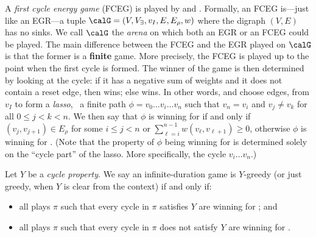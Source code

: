\documentclass[a4paper]{article}
\begin{document}
 A \emph{first cycle energy game} (FCEG)
is played by \eve and \adam. Formally, an FCEG is---just like an EGR---a tuple
$\calG = (V,V_\exists,v_I,E,E_\rho,w)$ where the digraph $(V,E)$ has no sinks.
We call $\calG$ the \emph{arena} on which both an EGR or an FCEG could be
played.  The main difference between the FCEG and the EGR played on $\calG$ is
that the former is a \textbf{finite} game. More precisely, the FCEG is played up
to the point when the first cycle is formed.  The winner of the game is then
determined by looking at the cycle: if it has a negative sum of weights and it
does not contain a reset edge, then \adam wins; else \eve wins. In other words,
\adam and \eve choose edges, from $v_I$ to form a \emph{lasso}, \ie~a finite
path $\phi = v_0 \dots v_i \dots v_n$ such that $v_n = v_i$ and $v_j \neq v_k$
for all $0 \le j < k < n$. We then say that $\phi$ is winning for \eve if and
only if $(v_j,v_{j+1}) \in E_\rho$ for some $i \le j < n$ or
$\sum_{\ell=i}^{n-1} w(v_\ell,v_{\ell+1}) \ge 0$, otherwise $\phi$ is winning
for \adam. (Note that the property of $\phi$ being winning for \eve is
determined solely on the ``cycle part'' of the lasso. More specifically, the
cycle $v_i \dots v_n$.)

Let $Y$ be a \emph{cycle property}. We say
an infinite-duration game is $Y$-greedy (or just greedy, when $Y$ is clear from
the context) if and only if:
\begin{itemize}
	\item all plays $\pi$ such that every cycle in $\pi$ satisfies $Y$ are
		winning for \eve; and
	\item all plays $\pi$ such that every cycle in $\pi$ does not satisfy
		$Y$ are winning for \adam.
\end{itemize}
\end{document}
